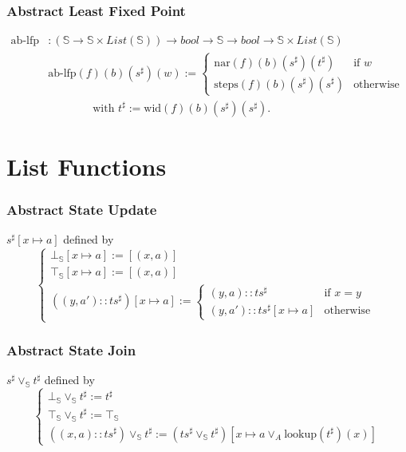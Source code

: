 \documentclass[aspectratio=169]{beamer}
\begin{document}
        \begin{frame}
            \frametitle{Abstract Least Fixed Point}
            \begin{align*}
                \text{ab-lfp} &: (\mathbb{S} \to \mathbb{S} \times List(\mathbb{S})) \to bool \to \mathbb{S} \to bool \to \mathbb{S} \times List(\mathbb{S}) \\
                &\text{ab-lfp} (f) (b) (s^{\sharp}) (w) := \begin{cases}
                                                        \text{nar} (f) (b) (s^{\sharp}) (t^{\sharp})  & \text{if } w \\
                                                        \text{steps} (f) (b) (s^{\sharp}) (s^{\sharp}) & \text{otherwise}
                                                        \end{cases} \\
                & \qquad \qquad \text{with } t^{\sharp} := \text{wid} (f) (b) (s^{\sharp}) (s^{\sharp}).
            \end{align*}
            
        \end{frame}
        
\section{List Functions}



\begin{frame}
    \frametitle{Abstract State Update}
    \( s^{\sharp}[x \mapsto a] \) defined by
    \[ 
        \begin{cases}
            \bot_\mathbb{S}[x \mapsto a] := [(x, a)] \\
            \top_\mathbb{S}[x \mapsto a] := [(x, a)] \\
            ((y, a') :: ts^{\sharp})[x \mapsto a] := \begin{cases}
                (y, a) :: {ts}^{\sharp} & \text{if } x = y \\
                (y, a') :: ts^{\sharp}[x \mapsto a] & \text{otherwise}
                \end{cases}
                                        \end{cases}
    \]
\end{frame}


\begin{frame}
    \frametitle{Abstract State Join}
    \( s^{\sharp} \vee_\mathbb{S} t^{\sharp}\) defined by
    \[
    \begin{cases}
        \bot_\mathbb{S} \vee_\mathbb{S} t^{\sharp} := t^{\sharp} \\  
        \top_\mathbb{S} \vee_\mathbb{S} t^{\sharp} := \top_\mathbb{S} \\
        ((x, a) :: {ts}^{\sharp}) \vee_\mathbb{S} t^{\sharp} := ({ts}^{\sharp} \vee_\mathbb{S} t^{\sharp})[x \mapsto a \vee_A \text{lookup} (t^{\sharp}) (x)]
                                                    \end{cases} \]
\end{frame}
\end{document}
